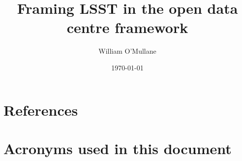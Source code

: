 \documentclass[OPS,authoryear,toc]{lsstdoc}
\title{Framing LSST in the open data centre framework}
\author{%
William O'Mullane
}
\date{\today}
\begin{document}

\mkshorttitle




\appendix
\section{References} \label{sec:bib}


\section{Acronyms used in this document}\label{sec:acronyms}

\end{document}

